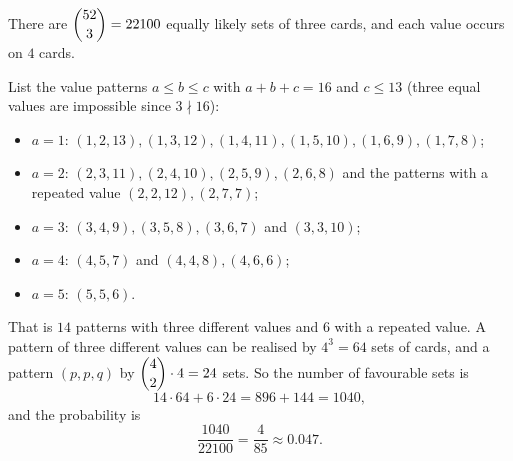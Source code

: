 There are $\dbinom{52}{3}=22100$ equally likely sets of three cards, and each value occurs on $4$ cards.

List the value patterns $a\le b\le c$ with $a+b+c=16$ and $c\le13$ (three equal values are impossible since $3\nmid16$):
\begin{itemize}
\item $a=1$: $(1,2,13),(1,3,12),(1,4,11),(1,5,10),(1,6,9),(1,7,8)$;
\item $a=2$: $(2,3,11),(2,4,10),(2,5,9),(2,6,8)$ and the patterns with a repeated value $(2,2,12),(2,7,7)$;
\item $a=3$: $(3,4,9),(3,5,8),(3,6,7)$ and $(3,3,10)$;
\item $a=4$: $(4,5,7)$ and $(4,4,8),(4,6,6)$;
\item $a=5$: $(5,5,6)$.
\end{itemize}
That is $14$ patterns with three different values and $6$ with a repeated value. A pattern of three different values can be realised by $4^3=64$ sets of cards, and a pattern $(p,p,q)$ by $\dbinom42\cdot4=24$ sets. So the number of favourable sets is
\[14\cdot64+6\cdot24=896+144=1040,\]
and the probability is
\[\dfrac{1040}{22100}=\boxed{\dfrac{4}{85}}\approx0.047 .\]
